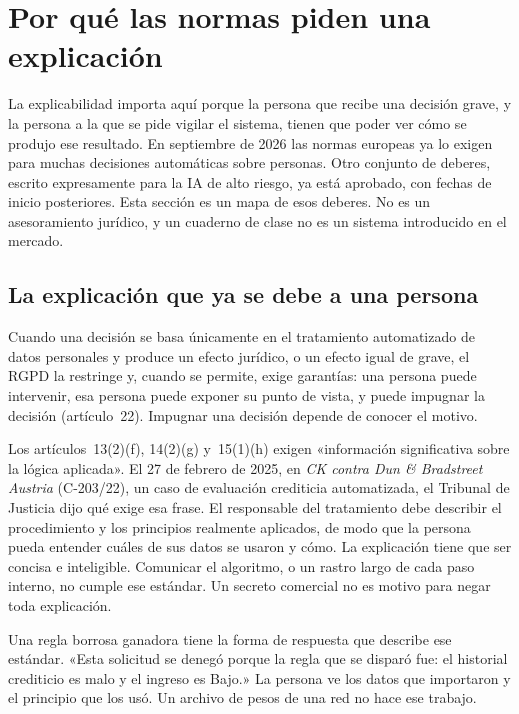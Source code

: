 \documentclass[11pt]{article}
\begin{document}
\section{Por qué las normas piden una explicación}
\label{sec:law}

La explicabilidad importa aquí porque la persona que recibe una decisión grave, y la persona a la que se pide vigilar el sistema, tienen que poder ver cómo se produjo ese resultado. En septiembre de 2026 las normas europeas ya lo exigen para muchas decisiones automáticas sobre personas. Otro conjunto de deberes, escrito expresamente para la IA de alto riesgo, ya está aprobado, con fechas de inicio posteriores. Esta sección es un mapa de esos deberes. No es un asesoramiento jurídico, y un cuaderno de clase no es un sistema introducido en el mercado.

\subsection{La explicación que ya se debe a una persona}

Cuando una decisión se basa únicamente en el tratamiento automatizado de datos personales y produce un efecto jurídico, o un efecto igual de grave, el RGPD la restringe y, cuando se permite, exige garantías: una persona puede intervenir, esa persona puede exponer su punto de vista, y puede impugnar la decisión (artículo~22). Impugnar una decisión depende de conocer el motivo.

Los artículos~13(2)(f), 14(2)(g) y~15(1)(h) exigen «información significativa sobre la lógica aplicada». El 27 de febrero de 2025, en \emph{CK contra Dun \& Bradstreet Austria} (C-203/22), un caso de evaluación crediticia automatizada, el Tribunal de Justicia dijo qué exige esa frase. El responsable del tratamiento debe describir el procedimiento y los principios realmente aplicados, de modo que la persona pueda entender cuáles de sus datos se usaron y cómo. La explicación tiene que ser concisa e inteligible. Comunicar el algoritmo, o un rastro largo de cada paso interno, no cumple ese estándar. Un secreto comercial no es motivo para negar toda explicación.

Una regla borrosa ganadora tiene la forma de respuesta que describe ese estándar. «Esta solicitud se denegó porque la regla que se disparó fue: el historial crediticio es malo y el ingreso es Bajo.» La persona ve los datos que importaron y el principio que los usó. Un archivo de pesos de una red no hace ese trabajo.
\end{document}
